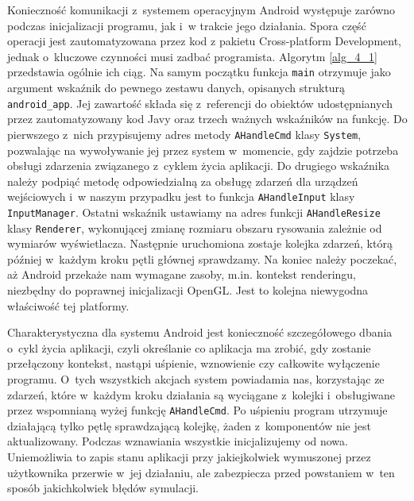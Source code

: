 		Konieczność komunikacji z~systemem operacyjnym Android występuje zarówno podczas inicjalizacji programu, jak i~w trakcie jego działania. Spora część operacji jest zautomatyzowana przez kod z pakietu Cross-platform Development, jednak o~kluczowe czynności musi zadbać programista. Algorytm \ref{alg_4_1} przedstawia ogólnie ich ciąg. Na samym początku funkcja \texttt{main} otrzymuje jako argument wskaźnik do pewnego zestawu danych, opisanych strukturą \texttt{android\_app}. Jej zawartość składa się z~referencji do obiektów udostępnianych przez zautomatyzowany kod Javy oraz trzech ważnych wskaźników na funkcję. Do pierwszego z~nich przypisujemy adres metody \texttt{AHandleCmd} klasy \texttt{System}, pozwalając na wywoływanie jej przez system w~momencie, gdy zajdzie potrzeba obsługi zdarzenia związanego z~cyklem życia aplikacji. Do drugiego wskaźnika należy podpiąć metodę odpowiedzialną za obsługę zdarzeń dla urządzeń wejściowych i~w naszym przypadku jest to funkcja \texttt{AHandleInput} klasy \texttt{InputManager}. Ostatni wskaźnik ustawiamy na adres funkcji \texttt{AHandleResize} klasy \texttt{Renderer}, wykonującej zmianę rozmiaru obszaru rysowania zależnie od wymiarów wyświetlacza. Następnie uruchomiona zostaje kolejka zdarzeń, którą później w~każdym kroku pętli głównej sprawdzamy. Na koniec należy poczekać, aż Android przekaże nam wymagane zasoby, m.in. kontekst renderingu, niezbędny do poprawnej inicjalizacji OpenGL. Jest to kolejna niewygodna właściwość tej platformy.
		
		Charakterystyczna dla systemu Android jest konieczność szczegółowego dbania o~cykl życia aplikacji, czyli określanie co aplikacja ma zrobić, gdy zostanie przełączony kontekst, nastąpi uśpienie, wznowienie czy całkowite wyłączenie programu. O~tych wszystkich akcjach system powiadamia nas, korzystając ze zdarzeń, które w~każdym kroku działania są wyciągane z~kolejki i~obsługiwane przez wspomnianą wyżej funkcję \texttt{AHandleCmd}. Po uśpieniu program utrzymuje działającą tylko pętlę sprawdzającą kolejkę, żaden z~komponentów nie jest aktualizowany. Podczas wznawiania wszystkie inicjalizujemy od nowa. Uniemożliwia to zapis stanu aplikacji przy jakiejkolwiek wymuszonej przez użytkownika przerwie w~jej działaniu, ale zabezpiecza przed powstaniem w~ten sposób jakichkolwiek błędów symulacji.
		
